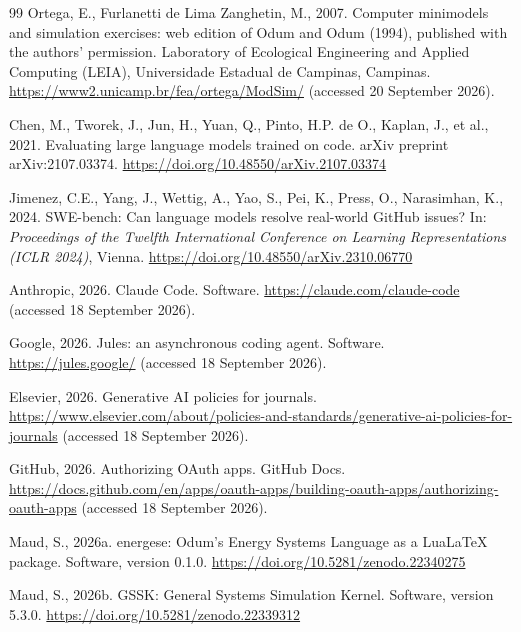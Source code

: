 \begin{thebibliography}{99}
Ortega, E., Furlanetti de Lima Zanghetin, M., 2007. Computer minimodels and simulation exercises: web edition of Odum and Odum (1994), published with the authors' permission. Laboratory of Ecological Engineering and Applied Computing (LEIA), Universidade Estadual de Campinas, Campinas. \url{https://www2.unicamp.br/fea/ortega/ModSim/} (accessed 20 September 2026).

Chen, M., Tworek, J., Jun, H., Yuan, Q., Pinto, H.P. de O., Kaplan, J., et al., 2021. Evaluating large language models trained on code. arXiv preprint arXiv:2107.03374. \url{https://doi.org/10.48550/arXiv.2107.03374}

Jimenez, C.E., Yang, J., Wettig, A., Yao, S., Pei, K., Press, O., Narasimhan, K., 2024. SWE-bench: Can language models resolve real-world GitHub issues? In: \emph{Proceedings of the Twelfth International Conference on Learning Representations (ICLR 2024)}, Vienna. \url{https://doi.org/10.48550/arXiv.2310.06770}

Anthropic, 2026. Claude Code. Software. \url{https://claude.com/claude-code} (accessed 18 September 2026). %

Google, 2026. Jules: an asynchronous coding agent. Software. \url{https://jules.google/} (accessed 18 September 2026).

Elsevier, 2026. Generative AI policies for journals. \url{https://www.elsevier.com/about/policies-and-standards/generative-ai-policies-for-journals} (accessed 18 September 2026).

GitHub, 2026. Authorizing OAuth apps. GitHub Docs. \url{https://docs.github.com/en/apps/oauth-apps/building-oauth-apps/authorizing-oauth-apps} (accessed 18 September 2026).

Maud, S., 2026a. energese: Odum's Energy Systems Language as a LuaLaTeX package. Software, version 0.1.0. \url{https://doi.org/10.5281/zenodo.22340275}

Maud, S., 2026b. GSSK: General Systems Simulation Kernel. Software, version 5.3.0. \url{https://doi.org/10.5281/zenodo.22339312}

\end{thebibliography}


